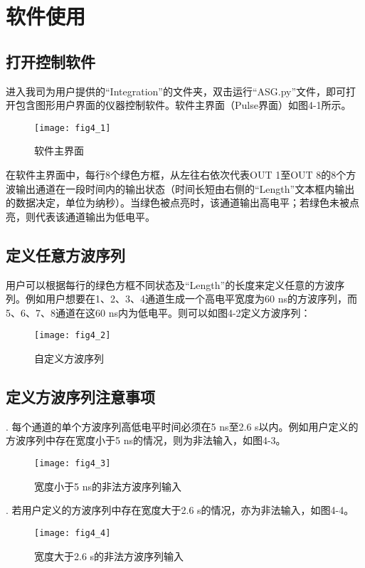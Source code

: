 \chapter{\heiti 软件使用}
\section{\heiti 打开控制软件}
进入我司为用户提供的“Integration”的文件夹，双击运行“ASG.py”文件，即可打开包含图形用户界面的仪器控制软件。软件主界面（Pulse界面）如图4-1所示。
\begin{figure}[ht]
\centering
\texttt{[image: fig4\_1]}
\caption{软件主界面}
\end{figure}

在软件主界面中，每行8个绿色方框，从左往右依次代表OUT 1至OUT 8的8个方波输出通道在一段时间内的输出状态（时间长短由右侧的“Length”文本框内输出的数据决定，单位为纳秒）。当绿色被点亮时，该通道输出高电平；若绿色未被点亮，则代表该通道输出为低电平。

\section{\heiti 定义任意方波序列}
用户可以根据每行的绿色方框不同状态及“Length”的长度来定义任意的方波序列。例如用户想要在1、2、3、4通道生成一个高电平宽度为60 ns的方波序列，而5、6、7、8通道在这60 ns内为低电平。则可以如图4-2定义方波序列：
\begin{figure}[ht]
\centering
\texttt{[image: fig4\_2]}
\caption{自定义方波序列}
\end{figure}

\section{\heiti 定义方波序列注意事项}
. 每个通道的单个方波序列高低电平时间必须在5 ns至2.6 s以内。例如用户定义的方波序列中存在宽度小于5 ns的情况，则为非法输入，如图4-3。
\begin{figure}[H]
\centering
\texttt{[image: fig4\_3]}
\caption{宽度小于5 ns的非法方波序列输入}
\end{figure}

\newpage
{}. 若用户定义的方波序列中存在宽度大于2.6 s的情况，亦为非法输入，如图4-4。
\begin{figure}[ht]
\centering
\texttt{[image: fig4\_4]}
\caption{宽度大于2.6 s的非法方波序列输入}
\end{figure}

